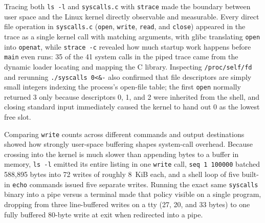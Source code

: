 \documentclass{assets/utmreport}
\begin{document}
\utmconclusions
Tracing both \texttt{ls -l} and \texttt{syscalls.c} with \texttt{strace} made the boundary between user space and the Linux kernel directly observable and measurable. Every direct file operation in \texttt{syscalls.c} (\texttt{open}, \texttt{write}, \texttt{read}, and \texttt{close}) appeared in the trace as a single kernel call with matching arguments, with glibc translating \texttt{open} into \texttt{openat}, while \texttt{strace -c} revealed how much startup work happens before \texttt{main} even runs: 35 of the 41 system calls in the piped trace came from the dynamic loader locating and mapping the C library. Inspecting \texttt{/proc/self/fd} and rerunning \texttt{./syscalls 0<\&-} also confirmed that file descriptors are simply small integers indexing the process's open-file table; the first \texttt{open} normally returned 3 only because descriptors 0, 1, and 2 were inherited from the shell, and closing standard input immediately caused the kernel to hand out 0 as the lowest free slot.

Comparing \texttt{write} counts across different commands and output destinations showed how strongly user-space buffering shapes system-call overhead. Because crossing into the kernel is much slower than appending bytes to a buffer in memory, \texttt{ls -l} emitted its entire listing in one \texttt{write} call, \texttt{seq 1 100000} batched 588,895 bytes into 72 writes of roughly 8~KiB each, and a shell loop of five built-in \texttt{echo} commands issued five separate writes. Running the exact same \texttt{syscalls} binary into a pipe versus a terminal made that policy visible on a single program, dropping from three line-buffered writes on a tty (27, 20, and 33 bytes) to one fully buffered 80-byte write at exit when redirected into a pipe.
\end{document}
